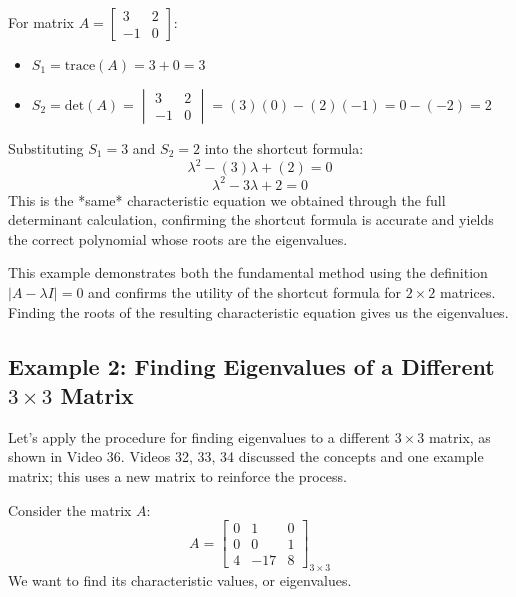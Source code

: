 \documentclass{article}
\begin{document}
For matrix $A = \begin{bmatrix} 3 & 2 \\ -1 & 0 \end{bmatrix}$:
\begin{itemize}
    \item $S_1 = \text{trace}(A) = 3 + 0 = 3$
    \item $S_2 = \text{det}(A) = \begin{vmatrix} 3 & 2 \\ -1 & 0 \end{vmatrix} = (3)(0) - (2)(-1) = 0 - (-2) = 2$
\end{itemize}
Substituting $S_1=3$ and $S_2=2$ into the shortcut formula:
\[ \lambda^2 - (3)\lambda + (2) = 0 \]
\[ \lambda^2 - 3\lambda + 2 = 0 \]
This is the *same* characteristic equation we obtained through the full determinant calculation, confirming the shortcut formula is accurate and yields the correct polynomial whose roots are the eigenvalues.

This example demonstrates both the fundamental method using the definition $|A - \lambda I| = 0$ and confirms the utility of the shortcut formula for $2 \times 2$ matrices. Finding the roots of the resulting characteristic equation gives us the eigenvalues.


\subsection{Example 2: Finding Eigenvalues of a Different $3 \times 3$ Matrix}

Let's apply the procedure for finding eigenvalues to a different $3 \times 3$ matrix, as shown in Video 36. Videos 32, 33, 34 discussed the concepts and one example matrix; this uses a new matrix to reinforce the process.

Consider the matrix $A$:
\[ A = \begin{bmatrix} 0 & 1 & 0 \\ 0 & 0 & 1 \\ 4 & -17 & 8 \end{bmatrix}_{3 \times 3} \]
We want to find its characteristic values, or eigenvalues.
\end{document}
